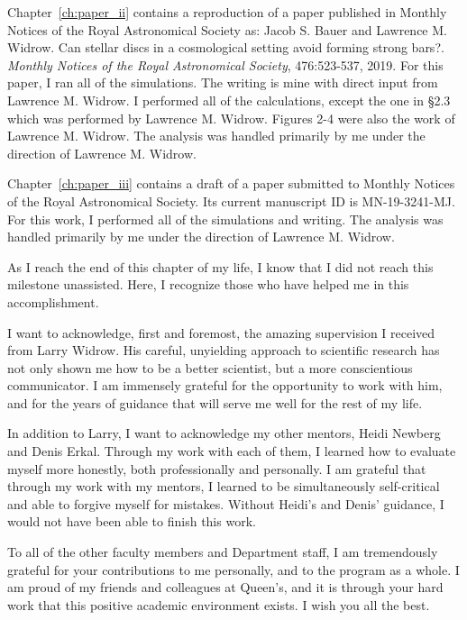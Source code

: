 Chapter~\ref{ch:paper_ii} contains a reproduction of a paper published in  Monthly Notices of the
Royal Astronomical Society as: Jacob S. Bauer and Lawrence M. Widrow. Can stellar discs in a cosmological setting avoid forming strong bars?. \textit{Monthly Notices of the Royal Astronomical Society}, 476:523-537,
2019. For this paper, I ran all of the simulations. The writing is mine with direct input from Lawrence M. Widrow. I performed all of the calculations, except the one in \S2.3 which was performed by Lawrence M. Widrow. Figures 2-4 were also the work of Lawrence M. Widrow. The analysis was handled primarily by me under the direction of Lawrence M. Widrow.

Chapter~\ref{ch:paper_iii} contains a draft of a paper submitted to Monthly Notices of the Royal Astronomical Society. Its current manuscript ID is MN-19-3241-MJ. For this work, I performed all of the simulations and writing. The analysis was handled primarily by me under the direction of Lawrence M. Widrow.




As I reach the end of this chapter of my life, I know that I did not reach this milestone unassisted. Here, I recognize those who have helped me in this accomplishment.

I want to acknowledge, first and foremost, the amazing supervision I received from Larry Widrow. His careful, unyielding approach to scientific research has not only shown me how to be a better scientist, but a more conscientious communicator. I am immensely grateful for the opportunity to work with him, and for the years of guidance that will serve me well for the rest of my life.

In addition to Larry, I want to acknowledge my other mentors, Heidi Newberg and Denis Erkal. Through my work with each of them, I learned how to evaluate myself more honestly, both professionally and personally. I am grateful that through my work with my mentors, I learned to be simultaneously self-critical and able to forgive myself for mistakes. Without Heidi's and Denis' guidance, I would not have been able to finish this work.

To all of the other faculty members and Department staff, I am tremendously grateful for your contributions to me personally, and to the program as a whole. I am proud of my friends and colleagues at Queen's, and it is through your hard work that this positive academic environment exists. I wish you all the best.

